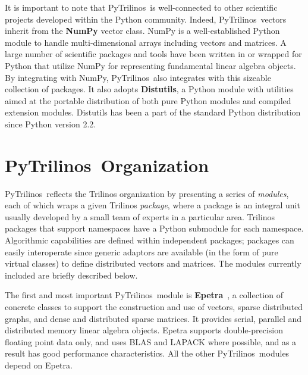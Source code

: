 \documentclass{llncs}
\newcommand{\PyTrilinos}{{\sc PyTrilinos}}
\begin{document}
It is important to note that \PyTrilinos\ is well-connected to other scientific
projects developed within the Python community. Indeed, \PyTrilinos\ vectors
inherit from the {\bf NumPy} vector class. NumPy is
a well-established Python module to handle multi-dimensional arrays including
vectors and matrices.  A large number of scientific packages and tools have
been written in or wrapped for Python that utilize NumPy for representing
fundamental linear algebra objects.  By integrating with NumPy, \PyTrilinos\
also integrates with this sizeable collection of packages. It also adopts {\bf
Distutils}, a Python module with utilities aimed at the portable distribution
of both pure Python modules and compiled extension modules.  Distutils has
been a part of the standard Python distribution since Python version 2.2.

\section{\PyTrilinos\ Organization}
\label{sec:organization}

\PyTrilinos\ reflects the Trilinos organization by presenting a series
of {\sl modules}, each of which wraps a given Trilinos {\sl package},
where a package is an integral unit usually developed by a small team
of experts in a particular area.  Trilinos packages that support
namespaces have a Python submodule for each namespace.  Algorithmic
capabilities are defined within independent packages; packages can
easily interoperate since generic adaptors are available (in the form
of pure virtual classes) to define distributed vectors and matrices. The
modules currently included are briefly described below.

\smallskip

\noindent
The first and most important \PyTrilinos\ module is {\bf
Epetra}~\cite{Epetra-Ref-Guide}, a collection of concrete classes to support
the construction and use of vectors, sparse distributed graphs, and dense and
distributed sparse matrices.  It provides serial, parallel and distributed
memory linear algebra objects.  Epetra supports double-precision floating
point data only, and uses BLAS and LAPACK where possible, and as a result has
good performance characteristics.  All the other \PyTrilinos\ modules depend on
Epetra.

\smallskip
\end{document}
